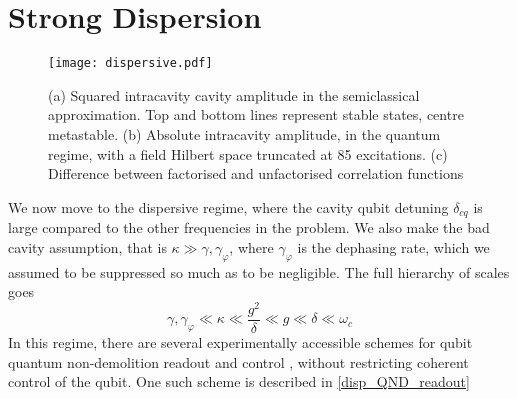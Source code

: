 \section{Strong Dispersion}
\begin{figure*}[ht]
    \label{dispersive}
    \texttt{[image: dispersive.pdf]}
    \caption{(a) Squared intracavity cavity amplitude in the semiclassical approximation. Top and bottom lines represent stable states, centre metastable. (b) Absolute intracavity amplitude, in the quantum regime, with a field Hilbert space truncated at 85 excitations. (c) Difference between factorised and unfactorised correlation functions}
\end{figure*}
We now move to the dispersive regime, where the cavity qubit detuning $\delta_{cq}$ is large compared to the other frequencies in the problem. 
We also make the bad cavity assumption, that is $\kappa \gg \gamma, \gamma_\varphi$, where $\gamma_\varphi$ is the dephasing rate, which we assumed to be suppressed so much as to be negligible.
The full hierarchy of scales goes
\begin{equation}
  \gamma, \gamma_\varphi \ll \kappa \ll \frac{g^2}{\delta} \ll g \ll \delta \ll \omega_c
\end{equation}
In this regime, there are several experimentally accessible schemes for qubit quantum non-demolition readout and control \cite{Blais2004a}, without restricting coherent control of the qubit.
One such scheme is described in \cref{disp_QND_readout} 

